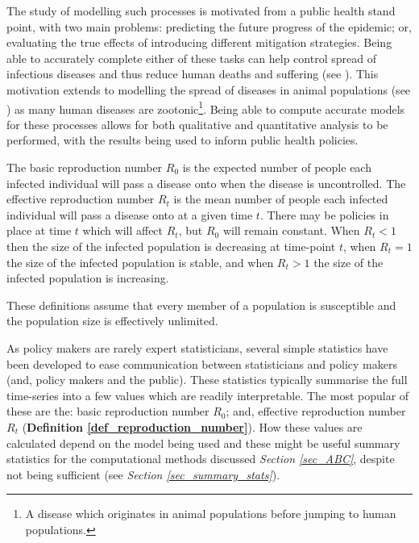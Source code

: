 \documentclass[11pt,a4paper]{article}
\theoremstyle{break}
\begin{document}
  \par The study of modelling such processes is motivated from a public health stand point, with two main problems: predicting the future progress of the epidemic; or, evaluating the true effects of introducing different mitigation strategies. Being able to accurately complete either of these tasks can help control spread of infectious diseases and thus reduce human deaths and suffering (see \cite[]{mitigation_measures_for_pandemic_influence_in_italy}). This motivation extends to modelling the spread of diseases in animal populations (see \cite[]{dynamic_model_of_bovine_tb_spread_and_control_in_great_britain}) as many human diseases are zootonic\footnote{A disease which originates in animal populations before jumping to human populations.}. Being able to compute accurate models for these processes allows for both qualitative and quantitative analysis to be performed, with the results being used to inform public health policies.

  \begin{box_definition}\label{def_reproduction_number}
    The basic reproduction number $R_0$ is the expected number of people each infected individual will pass a disease onto when the disease is uncontrolled. The effective reproduction number $R_t$ is the mean number of people each infected individual will pass a disease onto at a given time $t$. There may be policies in place at time $t$ which will affect $R_t$, but $R_0$ will remain constant. When $R_t<1$ then the size of the infected population is decreasing at time-point $t$, when $R_t=1$ the size of the infected population is stable, and when $R_t>1$ the size of the infected population is increasing.
    \par These definitions assume that every member of a population is susceptible and the population size is effectively unlimited.
  \end{box_definition}

  \par As policy makers are rarely expert statisticians, several simple statistics have been developed to ease communication between statisticians and policy makers (and, policy makers and the public). These statistics typically summarise the full time-series into a few values which are readily interpretable. The most popular of these are the: basic reproduction number $R_0$; and, effective reproduction number $R_t$ (\textbf{Definition \ref{def_reproduction_number}}). How these values are calculated depend on the model being used and these might be useful summary statistics for the computational methods discussed \textit{Section \ref{sec_ABC}}, despite not being sufficient (see \textit{Section \ref{sec_summary_stats}}).
\end{document}
